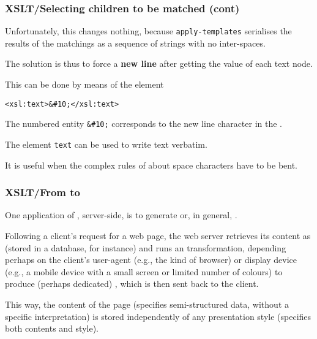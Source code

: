 %
\begin{frame}[containsverbatim]
\frametitle{XSLT/Selecting children to be matched (cont)}

Unfortunately, this changes nothing, because
\texttt{apply-templates} serialises the results of the
matchings as a sequence of strings with no inter-spaces.

\bigskip

The solution is thus to force a \textbf{new line} after getting the
value of each text node.

\bigskip

This can be done by means of the element
{\small
\begin{verbatim}
<xsl:text>&#10;</xsl:text>
\end{verbatim}
}
The numbered entity \verb|&#10;| corresponds to the new line character
in the \ASCII.

\bigskip

The \XSLT element \texttt{text} can be used to write text verbatim.

\bigskip

It is useful when the complex rules of \XML about space characters
have to be bent.

\end{frame}

%
\begin{frame}
\frametitle{XSLT/From \XML to \XHTML}

One application of \XML, server-side, is to generate \XHTML or,
in general, \HTML. 

\bigskip

Following a client's request for a web page, the web server retrieves
 its content as \XML (stored in a database, for instance) and runs an
 \XSLT transformation, depending perhaps on the client's
 user-agent (e.g., the kind of browser) or display device (e.g.,
 a mobile device with a small screen or limited number of colours) to
 produce (perhaps dedicated) \HTML, which is then sent back to the
 client.

\bigskip

This way, the content of the page (\XML specifies semi-structured
data, without a specific interpretation) is stored independently of
any presentation style (\HTML specifies both contents and style).

\end{frame}

